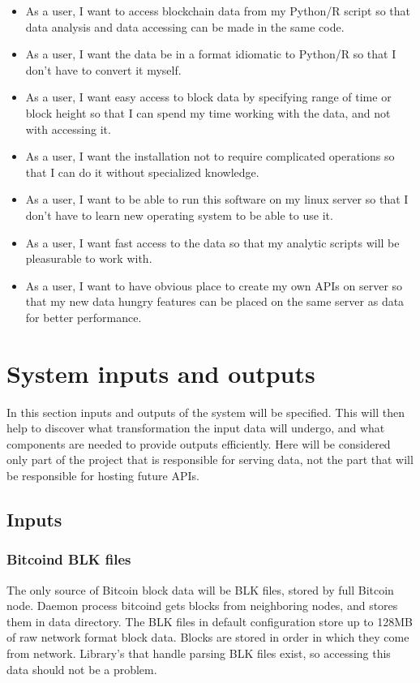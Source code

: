 \documentclass[12pt, en, eng, oneside, final]{mgr}
\begin{document}
\begin{itemize}
\item
As a user, I want to access blockchain data from my Python/R script so that data analysis and data accessing can be made in the same code.
\item
As a user, I want the data be in a format idiomatic to Python/R so that I don't have to convert it myself.
\item
As a user, I want easy access to block data by specifying range of time or block height so that I can spend my time working with the data, and not with accessing it.
\item
As a user, I want the installation not to require complicated operations so that I can do it without specialized knowledge.
\item
As a user, I want to be able to run this software on my linux server so that I don't have to learn new operating system to be able to use it.
\item
As a user, I want fast access to the data so that my analytic scripts will be pleasurable to work with.
\item
As a user, I want to have obvious place to create my own APIs on server so that my new data hungry features can be placed on the same server as data for better performance.
\end{itemize}



\section{System inputs and outputs}

In this section inputs and outputs of the system will be specified. This will then help to discover what transformation the input data will undergo, and what components are needed to provide outputs efficiently. Here will be considered only part of the project that is responsible for serving data, not the part that will be responsible for hosting future APIs.

\subsection{Inputs}
\subsubsection{Bitcoind BLK files}
The only source of Bitcoin block data will be BLK files, stored by full Bitcoin node. Daemon process bitcoind gets blocks from neighboring nodes, and stores them in data directory. The BLK files in default configuration store up to 128MB of raw network format block data. Blocks are stored in order in which they come from network. Library's that handle parsing BLK files exist, so accessing this data should not be a problem.
\end{document}
